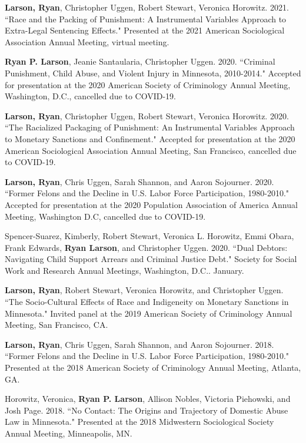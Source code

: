 \documentclass[letterpaper]{article}
\renewenvironment{itemize}{
  \begin{list}{}{
    \setlength{\leftmargin}{1.5em}
  }
}{
  \end{list}
}
\begin{document}
\begin{itemize}
\item \textbf{Larson, Ryan}, Christopher Uggen, Robert Stewart, Veronica Horowitz. 2021. ``Race and the Packing of Punishment: A Instrumental Variables Approach to Extra-Legal Sentencing Effects." Presented at the 2021 American Sociological Association Annual Meeting, virtual meeting. 

\item \textbf{Ryan P. Larson}, Jeanie Santaularia, Christopher Uggen. 2020. ``Criminal Punishment, Child Abuse, and Violent Injury in Minnesota, 2010-2014." Accepted for presentation at the 2020 American Society of Criminology Annual Meeting, Washington, D.C., cancelled due to COVID-19.  

\item \textbf{Larson, Ryan}, Christopher Uggen, Robert Stewart, Veronica Horowitz. 2020. ``The Racialized Packaging of Punishment: An Instrumental Variables Approach to Monetary Sanctions and Confinement." Accepted for presentation at the 2020 American Sociological Association Annual Meeting, San Francisco, cancelled due to COVID-19. 
\item \textbf{Larson, Ryan}, Chris Uggen, Sarah Shannon, and Aaron Sojourner. 2020. ``Former Felons and the Decline in U.S. Labor Force Participation, 1980-2010." Accepted for presentation at the 2020 Population Association of America Annual Meeting, Washington D.C, cancelled due to COVID-19. 
\item Spencer-Suarez, Kimberly, Robert Stewart, Veronica L. Horowitz, Emmi Obara, Frank Edwards, \textbf{Ryan Larson}, and Christopher Uggen. 2020. ``Dual Debtors: Navigating Child Support Arrears and Criminal Justice Debt." Society for Social Work and Research Annual Meetings, Washington, D.C.. January.
\item \textbf{Larson, Ryan}, Robert Stewart, Veronica Horowitz, and Christopher Uggen. ``The Socio-Cultural Effects of Race and Indigeneity on Monetary Sanctions in Minnesota." Invited panel at the 2019 American Society of Criminology Annual Meeting, San Francisco, CA.
\item \textbf{Larson, Ryan}, Chris Uggen, Sarah Shannon, and Aaron Sojourner. 2018. ``Former Felons and the Decline in U.S. Labor Force Participation, 1980-2010." Presented at the 2018 American Society of Criminology Annual Meeting, Atlanta, GA. 
\item Horowitz, Veronica, \textbf{Ryan P. Larson}, Allison Nobles, Victoria Piehowski, and Josh Page.  2018. ``No Contact: The Origins and Trajectory of Domestic Abuse Law in Minnesota." Presented at the 2018 Midwestern Sociological Society Annual Meeting, Minneapolis, MN. 

\end{itemize}
\end{document}

